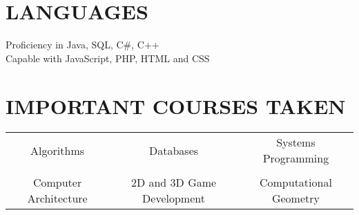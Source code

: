 \documentclass[margin]{res}
\begin{document}
\begin{resume}
 
\section{LANGUAGES} Proficiency in Java, SQL, C\#, C++\\
Capable with JavaScript, PHP, HTML and CSS \\

\section{IMPORTANT COURSES TAKEN}
\begin{tabular}{c c c}
Algorithms & Databases & Systems Programming \\
&&\\
Computer Architecture & 2D and 3D Game Development & Computational Geometry\\
\end{tabular}
               

 

\end{resume}
\end{document}
